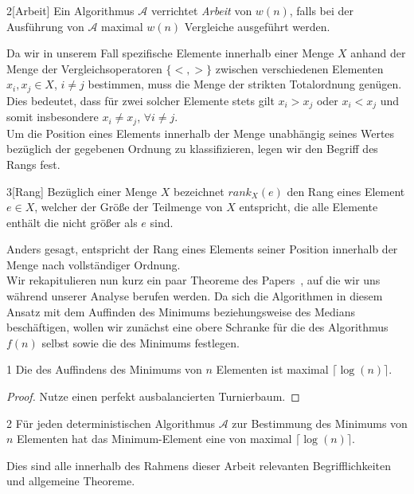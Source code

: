 \begin{manualdefinition}{2}[Arbeit]\label{def: work}
Ein Algorithmus $\mathcal{A}$ verrichtet \textit{Arbeit} von $w(n)$, falls bei der Ausführung von $\mathcal{A}$ maximal $w(n)$ Vergleiche ausgeführt werden.
\end{manualdefinition}

\noindent
Da wir in unserem Fall spezifische Elemente innerhalb einer Menge $X$ anhand der Menge der Vergleichsoperatoren $\{<,>\}$ zwischen verschiedenen Elementen $x_i,x_j\in X$, $i\neq j$ bestimmen, muss die Menge der strikten Totalordnung genügen. Dies bedeutet, dass für zwei solcher Elemente stets gilt $x_i > x_j$ oder $x_i < x_j$ und somit insbesondere $x_i \neq x_j$, $\forall i\neq j$.\\
Um die Position eines Elements innerhalb der Menge unabhängig seines Wertes bezüglich der gegebenen Ordnung zu klassifizieren, legen wir den Begriff des Rangs fest.
 
\begin{manualdefinition}{3}[Rang]\label{def: rank}
Bezüglich einer Menge $X$ bezeichnet $rank_X(e)$ den Rang eines Element $e\in X$, welcher der Größe der Teilmenge von $X$ entspricht, die alle Elemente enthält die nicht größer als $e$ sind.
\end{manualdefinition}

\noindent
Anders gesagt, entspricht der Rang eines Elements seiner Position innerhalb der Menge nach vollständiger Ordnung.\\[.1cm]
Wir rekapitulieren nun kurz ein paar Theoreme des Papers~\cite{meyer1}, auf die wir uns während unserer Analyse berufen werden. Da sich die Algorithmen in diesem Ansatz mit dem Auffinden des Minimums beziehungsweise des Medians beschäftigen, wollen wir zunächst eine obere Schranke für die \fg des Algorithmus $f(n)$ selbst sowie die des Minimums \fgm festlegen.

\begin{manualtheorem}{1}\label{theo: fgc_min}
Die \fg des Auffindens des Minimums von $n$ Elementen ist maximal $\lceil \log(n)\rceil$.
\end{manualtheorem}
\begin{proof}
Nutze einen perfekt ausbalancierten Turnierbaum.
\end{proof}

\begin{manualtheorem}{2}\label{theo: fgc_min_det}
Für jeden deterministischen Algorithmus $\mathcal{A}$ zur Bestimmung des Minimums von $n$ Elementen hat das Minimum-Element eine \fg \fgm von maximal $\lceil \log(n)\rceil$.
\end{manualtheorem}

\noindent
Dies sind alle innerhalb des Rahmens dieser Arbeit relevanten Begrifflichkeiten und allgemeine Theoreme.
